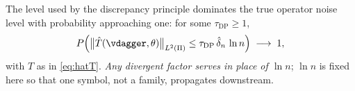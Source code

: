 \begin{assumption}\label{ass:stopfeas}
The level used by the discrepancy principle dominates the true operator noise level with probability
approaching one: for some $\tau_{\mathrm{DP}}\ge1$,
\begin{equation}\label{eq:a7amend}
P\Big(\big\|\hat T(\vdagger,\theta)\big\|_{L^2(\Pi)}\le\tau_{\mathrm{DP}}\,\hat\delta_n\,\ln n\Big)
\;\longrightarrow\;1 ,
\end{equation}
with $\hat T$ as in \eqref{eq:hatT}. \emph{Any divergent factor serves in place of $\ln n$}; $\ln n$ is
fixed here so that one symbol, not a family, propagates downstream.
\end{assumption}

%

